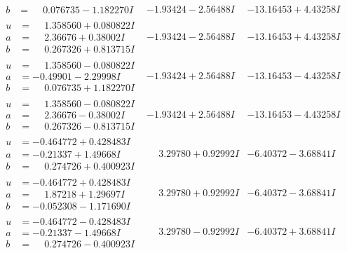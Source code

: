 \documentclass[1p]{elsarticle_modified}
\theoremstyle{definition}
\begin{document}
$$\begin{array}{c|c|c}
\begin{aligned}
b &= \phantom{-}0.076735 - 1.182270 I\end{aligned}
 & -1.93424 - 2.56488 I & -13.16453 + 4.43258 I \\ \hline\begin{aligned}
u &= \phantom{-}1.358560 + 0.080822 I \\
a &= \phantom{-}2.36676 + 0.38002 I \\
b &= \phantom{-}0.267326 + 0.813715 I\end{aligned}
 & -1.93424 - 2.56488 I & -13.16453 + 4.43258 I \\ \hline\begin{aligned}
u &= \phantom{-}1.358560 - 0.080822 I \\
a &= -0.49901 - 2.29998 I \\
b &= \phantom{-}0.076735 + 1.182270 I\end{aligned}
 & -1.93424 + 2.56488 I & -13.16453 - 4.43258 I \\ \hline\begin{aligned}
u &= \phantom{-}1.358560 - 0.080822 I \\
a &= \phantom{-}2.36676 - 0.38002 I \\
b &= \phantom{-}0.267326 - 0.813715 I\end{aligned}
 & -1.93424 + 2.56488 I & -13.16453 - 4.43258 I \\ \hline\begin{aligned}
u &= -0.464772 + 0.428483 I \\
a &= -0.21337 + 1.49668 I \\
b &= \phantom{-}0.274726 + 0.400923 I\end{aligned}
 & \phantom{-}3.29780 + 0.92992 I & -6.40372 - 3.68841 I \\ \hline\begin{aligned}
u &= -0.464772 + 0.428483 I \\
a &= \phantom{-}1.87218 + 1.29697 I \\
b &= -0.052308 - 1.171690 I\end{aligned}
 & \phantom{-}3.29780 + 0.92992 I & -6.40372 - 3.68841 I \\ \hline\begin{aligned}
u &= -0.464772 - 0.428483 I \\
a &= -0.21337 - 1.49668 I \\
b &= \phantom{-}0.274726 - 0.400923 I\end{aligned}
 & \phantom{-}3.29780 - 0.92992 I & -6.40372 + 3.68841 I \\ \hline\begin{aligned}

\end{aligned}
\end{array}$$
\end{document}
